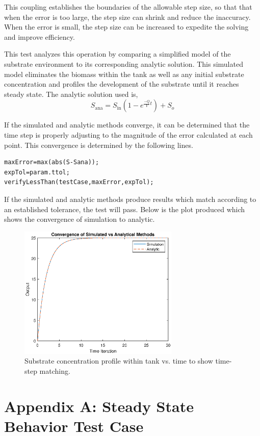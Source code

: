 \documentclass[letterpaper, twoside]{article}
\numberwithin{equation}{section}
\begin{document}
This coupling establishes the boundaries of the allowable step size, so that that when the error is too large, the step size can shrink and reduce the inaccuracy. When the error is small, the step size can be increased to expedite the solving and improve efficiency. 

This test analyzes this operation by comparing a simplified model of the substrate environment to its corresponding analytic solution. This simulated model eliminates the biomass within the tank as well as any initial substrate concentration and profiles the development of the substrate until it reaches steady state. The analytic solution used is,
\begin{equation} \label{eq: S_ana}
  S_\mathrm{ana}=S_\mathrm{in}{(1-e^{\frac{-Q}{V}t})} + S_o
\end{equation}

If the simulated and analytic methods converge, it can be determined that the time step is properly adjusting to the magnitude of the error calculated at each point. This convergence is determined by the following lines.

\begin{lstlisting}
maxError=max(abs(S-Sana));
expTol=param.ttol;
verifyLessThan(testCase,maxError,expTol);
\end{lstlisting}

If the simulated and analytic methods produce results which match according to an established tolerance, the test will pass. Below is the plot produced which shows the convergence of simulation to analytic.

\begin{figure}[H]
  \centering
  \includegraphics[read=eps, width=3in]{TimeDynamics_Figure.eps}
  \caption{Substrate concentration profile within tank vs. time to show time-step matching.}
\end{figure}

\section{Appendix A: Steady State Behavior Test Case}\label{Steady State}
\end{document}
